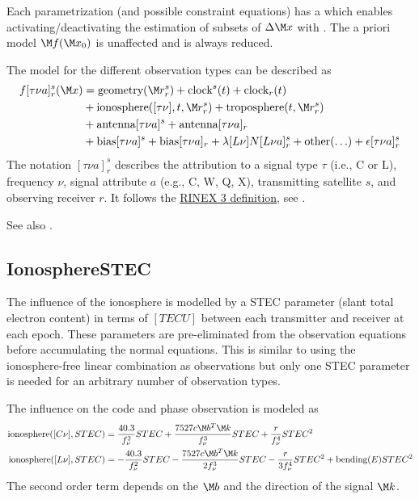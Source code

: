 Each parametrization (and possible constraint equations) has a  which enables
activating/deactivating the estimation of subsets of $\Delta\M x$ with
.
The a priori model $\M f(\M x_0)$ is unaffected and is always reduced.

The model for the different observation types can be described as
\begin{equation}\label{gnssParametrizationType:gnssFullModel}
\begin{split}
  f[\tau\nu a]_r^s(\M x) &= \text{geometry}(\M r_r^s) + \text{clock}^s(t) + \text{clock}_r(t) \\
               &+ \text{ionosphere}([\tau\nu],t,\M r_r^s) + \text{troposphere}(t,\M r_r^s) \\
               &+ \text{antenna}[\tau\nu a]^s  + \text{antenna}[\tau\nu a]_r \\
               &+ \text{bias}[\tau\nu a]^s + \text{bias}[\tau\nu a]_r
               + \lambda[L\nu] N[L\nu a]_r^s + \text{other}(\ldots) + \epsilon[\tau\nu a]_r^s
\end{split}
\end{equation}
The notation $[\tau\nu a]_r^s$ describes the
attribution to a signal type $\tau$ (i.e., C or L), frequency $\nu$,
signal attribute $a$ (e.g., C, W, Q, X), transmitting satellite $s$, and observing receiver $r$.
It follows the \href{https://files.igs.org/pub/data/format/rinex305.pdf}{RINEX 3 definition},
see .

See also .


\subsection{IonosphereSTEC}\label{gnssParametrizationType:ionosphereSTEC}
The influence of the ionosphere is modelled by a STEC parameter (slant total electron content)
in terms of $[TECU]$ between each transmitter and receiver at each epoch. These parameters are pre-eliminated
from the observation equations before accumulating the normal equations.
This is similar to using the ionosphere-free linear combination as observations
but only one STEC parameter is needed for an arbitrary number of observation types.

The influence on the code and phase observation is modeled as
\begin{equation}
\begin{split}
\text{ionosphere}([C\nu], STEC) &=  \frac{40.3}{f_{\nu}^2}STEC + \frac{7527 c \M b^T\M k}{f_{\nu}^3}STEC +  \frac{r}{f_{\nu}^4}STEC^2 \\
\text{ionosphere}([L\nu], STEC) &= -\frac{40.3}{f_{\nu}^2}STEC - \frac{7527 c \M b^T\M k}{2f_{\nu}^3}STEC - \frac{r}{3f_{\nu}^4}STEC^2 + \text{bending}(E)STEC^2
\end{split}
\label{gnssParametrizationType:IonosphereSTEC:STEC}
\end{equation}
The second order term depends on the  $\M b$
and the direction of the signal $\M k$.

